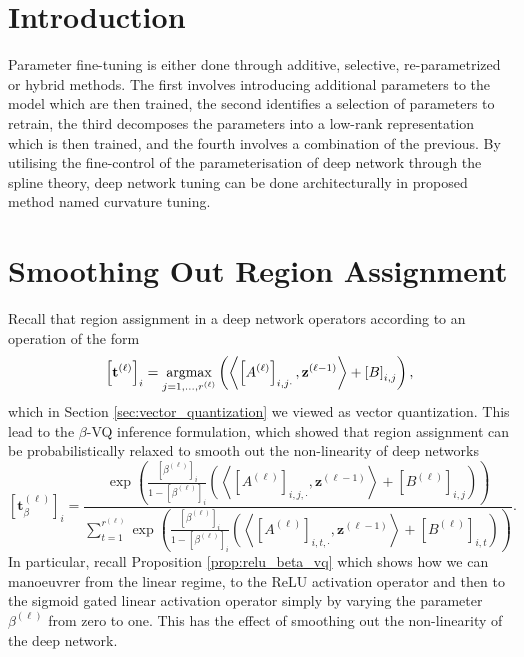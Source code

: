 \section{Introduction}

Parameter fine-tuning is either done through additive, selective, re-parametrized or hybrid methods. The first involves introducing additional parameters to the model which are then trained, the second identifies a selection of parameters to retrain, the third decomposes the parameters into a low-rank representation which is then trained, and the fourth involves a combination of the previous. By utilising the fine-control of the parameterisation of deep network through the spline theory, deep network tuning can be done architecturally in proposed method named curvature tuning.

\section{Smoothing Out Region Assignment}

Recall that region assignment in a deep network operators according to an operation of the form 
\begin{equation}\label{eq:region_assignment}
    \left[\mathbf{t}^{(\ell)}\right]_i=\operatorname*{\mathrm{argmax}}_{j=1,\dots,r^{(\ell)}}\left(\left\langle\left[A^{(\ell)}\right]_{i,j\cdot},\mathbf{z}^{(\ell-1)}\right\rangle+\left[B\right]_{i,j}\right),
\end{equation}
which in Section \ref{sec:vector_quantization} we viewed as vector quantization. This lead to the $\beta$-VQ inference formulation, which showed that region assignment can be probabilistically relaxed to smooth out the non-linearity of deep networks
\begin{equation}\label{eq:vq_curvature_tuning}
    \left[\mathbf{t}_{\beta}^{(\ell)}\right]_i=\frac{\exp\left(\frac{\left[\beta^{(\ell)}\right]_i}{1-\left[\beta^{(\ell)}\right]_i}\left(\left\langle\left[A^{(\ell)}\right]_{i,j,\cdot},\mathbf{z}^{(\ell-1)}\right\rangle+\left[B^{(\ell)}\right]_{i,j}\right)\right)}{\sum_{t=1}^{r^{(\ell)}}\exp\left(\frac{\left[\beta^{(\ell)}\right]_i}{1-\left[\beta^{(\ell)}\right]_i}\left(\left\langle\left[A^{(\ell)}\right]_{i,t,\cdot},\mathbf{z}^{(\ell-1)}\right\rangle+\left[B^{(\ell)}\right]_{i,t}\right)\right)}.
\end{equation}
In particular, recall Proposition \ref{prop:relu_beta_vq} which shows how we can manoeuvrer from the linear regime, to the ReLU activation operator and then to the sigmoid gated linear activation operator simply by varying the parameter $\beta^{(\ell)}$ from zero to one. This has the effect of smoothing out the non-linearity of the deep network.

